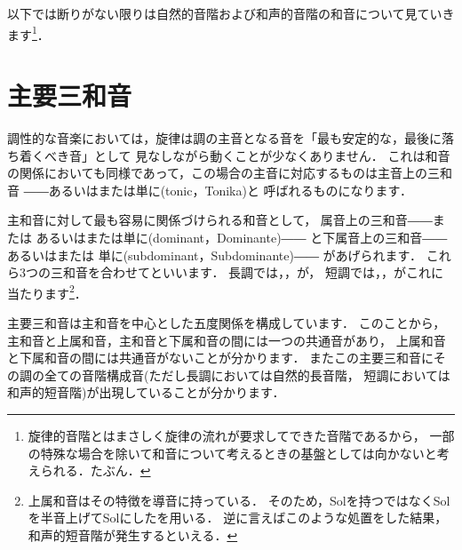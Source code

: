 \documentclass[dvipdfmx,uplatex,b5paper,openany,jbase=12Q,nomag*,textwidth-limit=44%
               ]{gachimuchi}[2020/05/05]
\begin{document}
以下では断りがない限りは自然的音階および和声的音階の和音について見ていきます\footnote{%
  旋律的音階とはまさしく旋律の流れが要求してできた音階であるから，
  一部の特殊な場合を除いて和音について考えるときの基盤としては向かないと考えられる．たぶん．
}．
\section{主要三和音}
調性的な音楽においては，旋律は調の主音となる音を「最も安定的な，最後に落ち着くべき音」として
見なしながら動くことが少なくありません．
これは和音の関係においても同様であって，この場合の主音に対応するものは主音上の三和音
――あるいはまたは単に\xkanjispace(tonic，Tonika)と
呼ばれるものになります．

主和音に対して最も容易に関係づけられる和音として，
属音上の三和音――または%
あるいはまたは単に\jghost(dominant，Dominante)――%
と下属音上の三和音――あるいはまたは
単に\jghost(subdominant，Subdominante)――%
があげられます．
これら3つの三和音を合わせてといいます．
長調では\Gni ，\Gniv ，\Gnv が，
短調では\Gni\Min ，\Gniv\Min ，\Gnv がこれに当たります\footnote{上属和音はその特徴を導音に持っている．
そのため，Solを持つ\Gnv\Min ではなくSolを半音上げてSol\aSharp にした\Gnv を用いる．
逆に言えばこのような処置をした結果，和声的短音階が発生するといえる．
}．

\begin{Music}[0.6\linewidth]
  \nostartrule%
  \Startpiece%
  \Notes{}%
  \zchordsl{\Gni}%
  \zchordsl{\Gniv}%
  \zchordsl{\Gnv}%
  \en%
  \changecontext%
  \Notes{}%
  \zchordsl{\Gni\Min}%
  \zchordsl{\Gniv\Min}%
  \zchordsl{\Gnv}%
  \en%
  \endpiece%
\end{Music}

主要三和音は主和音を中心とした五度関係を構成しています．
このことから，主和音と上属和音，主和音と下属和音の間には一つの共通音があり，
上属和音と下属和音の間には共通音がないことが分かります．
またこの主要三和音にその調の全ての音階構成音(ただし長調においては自然的長音階，
短調においては和声的短音階)が出現していることが分かります．
\end{document}

